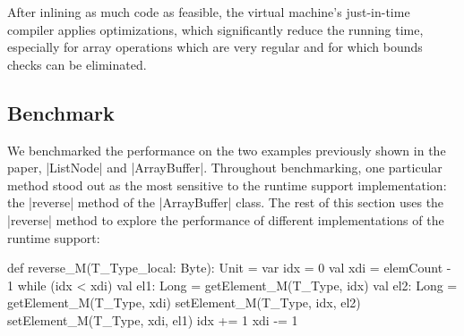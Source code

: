 After inlining as much code as feasible, the virtual machine's just-in-time compiler applies optimizations, which significantly reduce the running time, especially for array operations which are very regular and for which bounds checks can be eliminated.
\subsection{Benchmark}
\label{subsec-mb-bench}

We benchmarked the performance on the two examples previously shown in the paper, |ListNode| and |ArrayBuffer|. Throughout benchmarking, one particular method stood out as the most sensitive to the runtime support implementation: the |reverse| method of the |ArrayBuffer| class. The rest of this section uses the |reverse| method to explore the performance of different implementations of the runtime support:   

\begin{lstlisting-nobreak}
 def reverse_M(T_Type_local: Byte): Unit = {
   var idx = 0
   val xdi = elemCount - 1
   while (idx < xdi) {
     val el1: Long = getElement_M(T_Type, idx)
     val el2: Long = getElement_M(T_Type, xdi)
     setElement_M(T_Type, idx, el2)
     setElement_M(T_Type, xdi, el1)
     idx += 1
     xdi -= 1
   }
 }
\end{lstlisting-nobreak}

\newcommand{\optpm}[1]{}

